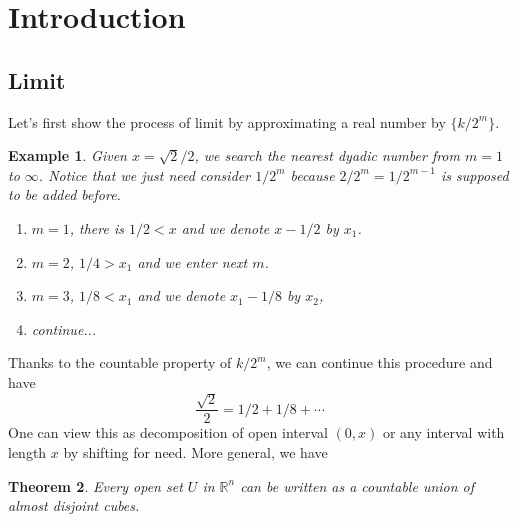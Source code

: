 \documentclass{article}
\numberwithin{equation}{section}
\newtheorem{Theorem}{Theorem}[section] %
\newtheorem{Example}[Theorem]{Example}
\newcommand{\Rn}{\mathbb{R}^{n}}
\begin{document}
\large


\section{Introduction}

\subsection{Limit}
Let's first show the process of limit by approximating a real number by $\{k/2^{m}\}$.
\begin{Example}
    Given $x=\sqrt{2}/2$, we search the nearest dyadic number from $m=1$ to $\infty$. Notice that we just need consider $1/2^{m}$ because $2/2^{m}=1/2^{m-1}$ is supposed to be added before.
    \begin{enumerate}
        \item $m=1$, there is $1/2<x$ and we denote $x-1/2$ by $x_{1}$.
        \item $m=2$, $1/4>x_{1}$ and we enter next $m$.
        \item $m=3$, $1/8<x_{1}$ and we denote $x_{1}-1/8$ by $x_{2}$,
        \item continue...
    \end{enumerate}
\end{Example}
Thanks to the countable property of $k/2^{m}$, we can continue this procedure and have
$$
\frac{\sqrt{2}}{2}=1/2+1/8+\cdots
$$
One can view this as decomposition of open interval $(0,x)$ or any interval with length $x$ by shifting for need. More general, we have
\begin{Theorem}
    Every open set $U$ in $\Rn$ can be written as a countable union of almost disjoint cubes.
\end{Theorem}
\end{document}
